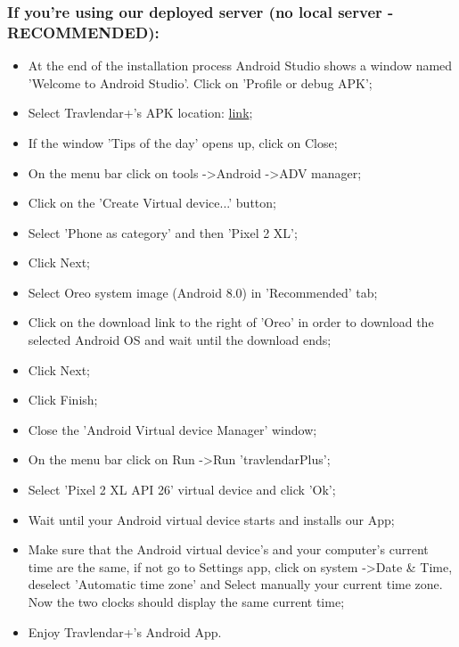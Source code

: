 \subsubsection{If you're using our deployed server (no local server - RECOMMENDED):}
\begin{itemize}
	\item At the end of the installation process Android Studio shows a window named 'Welcome to Android Studio'. Click on 'Profile or debug APK';
	\item Select Travlendar+'s APK location: \href{https://github.com/JustSalva/MelziPinaSalvadore/tree/master/DeliveryFolder/InstallationFolder}{\color{blue}link};
	\item If the window 'Tips of the day' opens up, click on Close;
	\item On the menu bar click on tools -\textgreater Android -\textgreater ADV manager;
	\item Click on the 'Create Virtual device...' button;
	\item Select 'Phone as category' and then 'Pixel 2 XL';
	\item Click Next;
	\item Select Oreo system image (Android 8.0) in 'Recommended' tab;
	\item Click on the download link to the right of 'Oreo' in order to download the selected Android OS and wait until the download ends; 
	\item Click Next;
	\item Click Finish;
	\item Close the 'Android Virtual device Manager' window;
	\item On the menu bar click on Run -\textgreater Run 'travlendarPlus';
	\item Select 'Pixel 2 XL API 26' virtual device and click 'Ok';
	\item Wait until your Android virtual device starts and installs our App;
	\item Make sure that the Android virtual device's and your computer's current time are the same, if not go to Settings app, click on system -\textgreater Date \& Time, deselect 'Automatic time zone' and Select manually your current time zone. Now the two clocks should display the same current time;
	\item Enjoy Travlendar+'s Android App.	
\end{itemize}

